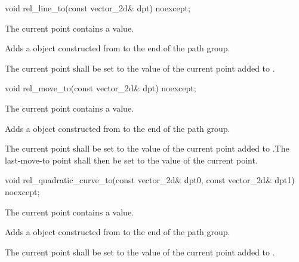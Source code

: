 \begin{itemdecl}
    void rel_line_to(const vector_2d& dpt) noexcept;
\end{itemdecl}
\begin{itemdescr}
	\pnum
	\requires
	The current point contains a value.
	
	\pnum
	\effects
	Adds a  object constructed from  to the end of the path group.
	
	\pnum
	The current point shall be set to the value of the current point added to .
\end{itemdescr}

\begin{itemdecl}
    void rel_move_to(const vector_2d& dpt) noexcept;
\end{itemdecl}
\begin{itemdescr}
	\pnum
	\requires
	The current point contains a value.
	
	\pnum
	\effects
	Adds a  object constructed from  to the end of the path group.
	
	\pnum
	The current point shall be set to the value of the current point added to .The last-move-to point shall then be set to the value of the current point.
\end{itemdescr}

\begin{itemdecl}
	void rel_quadratic_curve_to(const vector_2d& dpt0, const vector_2d& dpt1)
	  noexcept;
\end{itemdecl}
\begin{itemdescr}
	\pnum
	\requires
	The current point contains a value.
	
	\pnum
	\effects
	Adds a  object constructed from  to the end of the path group.
	
	\pnum
	The current point shall be set to the value of the current point added to .
\end{itemdescr}

